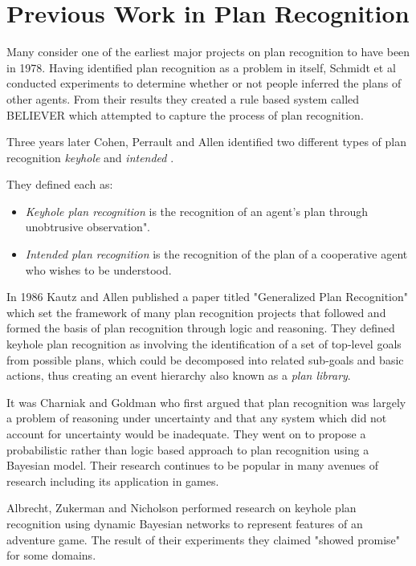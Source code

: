\documentclass[parskip]{cs4rep}
\begin{document}
\section{Previous Work in Plan Recognition}

Many consider one of the earliest major projects on plan recognition to have been in 1978. Having identified plan recognition as a problem in itself, Schmidt et al \cite{journals/ai/SchmidtSG78} conducted experiments to determine whether or not people inferred the plans of other agents. From their results they created a rule based system called BELIEVER which attempted to capture the process of plan recognition. 

Three years later Cohen, Perrault and Allen identified two different types of plan recognition \textit{keyhole} and \textit{intended} \cite{Cohen82a}. 

They defined each as:

\begin{itemize}
\item
\textit{Keyhole plan recognition} is the recognition of an agent's plan through unobtrusive observation".
\item
\textit{Intended plan recognition} is the recognition of the plan of a cooperative agent who wishes to be understood.
\newline
\end{itemize}

In 1986 Kautz and Allen published a paper titled "Generalized Plan Recognition" \cite{conf/aaai/KautzA86} which set the framework of many plan recognition projects that followed and formed the basis of plan recognition through logic and reasoning. They defined keyhole plan recognition as involving the identification of a set of top-level goals from possible plans, which could be decomposed into related sub-goals and basic actions, thus creating an event hierarchy also known as a \textit{plan library}. 

It was Charniak and Goldman \cite{journals/ai/CharniakG93} who first argued that plan recognition was largely a problem of reasoning under uncertainty and that any system which did not account for uncertainty would be inadequate. They went on to propose a probabilistic rather than logic based approach to  plan recognition using a Bayesian model. Their research continues to be popular in many avenues of research including its application in games.

Albrecht, Zukerman and Nicholson \cite{Albrecht:1998:BMK:598277.598308} performed research on keyhole plan recognition using dynamic Bayesian networks to represent features of an adventure game. The result of their experiments they claimed "showed promise" for some domains. 
\end{document}
